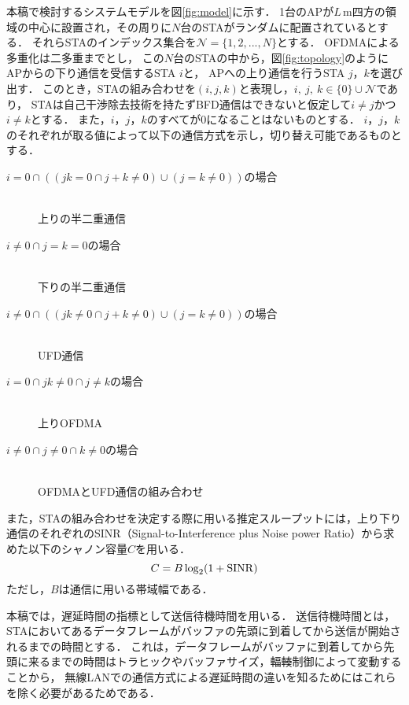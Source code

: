 \documentclass[technicalreport]{ieicej}
\newcommand{\sijk}{(i,j,k)}
\newcommand{\mN}{{\mathcal N}}
\begin{document}
	本稿で検討するシステムモデルを図\ref{fig:model}に示す．
	1台のAPが$L$\,m四方の領域の中心に設置され，その周りに$N$台のSTAがランダムに配置されているとする．
	それらSTAのインデックス集合を$\mN=\{1,2,...,N\}$とする．
	OFDMAによる多重化は二多重までとし，
	この$N$台のSTAの中から，図\ref{fig:topology}のようにAPからの下り通信を受信するSTA $i$と，
	APへの上り通信を行うSTA $j$，$k$を選び出す．
	このとき，STAの組み合わせを$\sijk$と表現し，$i,\ j,\ k \in \{0\}\cup \mN$であり，
	STAは自己干渉除去技術を持たずBFD通信はできないと仮定して$i\neq j$かつ$i\neq k$とする．
	また，$i$，$j$，$k$のすべてが0になることはないものとする．
	$i$，$j$，$k$のそれぞれが取る値によって以下の通信方式を示し，切り替え可能であるものとする．
	\begin{description}
		\item[\hspace{15pt}$i=0\cap ((jk=0 \cap j+k\neq0) \cup(j=k\neq0))$の場合]\mbox{}\\
			\hspace{30pt}上りの半二重通信
		\item[\hspace{15pt}$i\neq0 \cap j=k=0$の場合]\mbox{}\\
			\hspace{30pt}下りの半二重通信
		\item[\hspace{15pt}$i\neq0 \cap ((jk\neq0 \cap j+k\neq0) \cup (j=k\neq0))$の場合]\mbox{}\\
			\hspace{30pt}UFD通信
		\item[\hspace{15pt}$i=0 \cap jk\neq0 \cap j\neq k$の場合]\mbox{}\\
			\hspace{30pt}上りOFDMA
		\item[\hspace{15pt}$i\neq0 \cap j\neq0 \cap k\neq0$の場合]\mbox{}\\
			\hspace{30pt}OFDMAとUFD通信の組み合わせ
	\end{description}
	\par
	また，STAの組み合わせを決定する際に用いる推定スループットには，上り下り通信のそれぞれのSINR（Signal-to-Interference plus Noise power Ratio）から求めた以下のシャノン容量$C$を用いる．
	\begin{equation}
		C=B\log_2(1+{\rm SINR}) \label{eq:capacity}
	\end{equation}
	ただし，$B$は通信に用いる帯域幅である．
	\par
	本稿では，遅延時間の指標として送信待機時間を用いる．
	送信待機時間とは，STAにおいてあるデータフレームがバッファの先頭に到着してから送信が開始されるまでの時間とする．
	これは，データフレームがバッファに到着してから先頭に来るまでの時間はトラヒックやバッファサイズ，輻輳制御によって変動することから，
	無線LANでの通信方式による遅延時間の違いを知るためにはこれらを除く必要があるためである．
\end{document}
